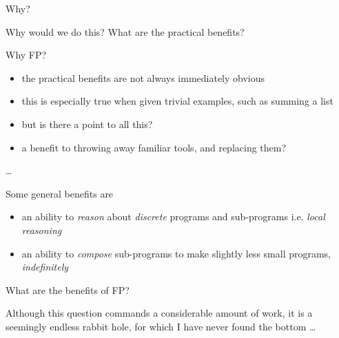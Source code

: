 \begin{frame}
\begin{block}{Why?}
\begin{center}
Why would we do this? What are the practical benefits?
\end{center}
\end{block}
\end{frame}

\begin{frame}
\begin{block}{Why FP?}
\begin{center}
\begin{itemize}
\item<1-> the practical benefits are not always immediately obvious
\item<2-> this is especially true when given trivial examples, such as summing a list
\item<3-> but is there a point to all this?
\item<4-> a benefit to throwing away familiar tools, and replacing them?
\end{itemize}
\end{center}
\end{block}
\end{frame}

\begin{frame}
\begin{center}
\ldots
\end{center}
\end{frame}

\begin{frame}
\begin{block}{Some general benefits are}
\begin{center}
\begin{itemize}
\item<1-> an ability to \emph{reason} about \emph{discrete} programs and sub-programs i.e. \emph{local reasoning}
\item<2-> an ability to \emph{compose} sub-programs to make slightly less small programs, \emph{indefinitely}
\end{itemize}
\end{center}
\end{block}
\end{frame}

\begin{frame}
\begin{block}{What are the benefits of FP?}
\begin{center}
Although this question commands a considerable amount of work, it is a seemingly endless rabbit hole, for which I have never found the bottom \ldots
\end{center}
\end{block}
\end{frame}
